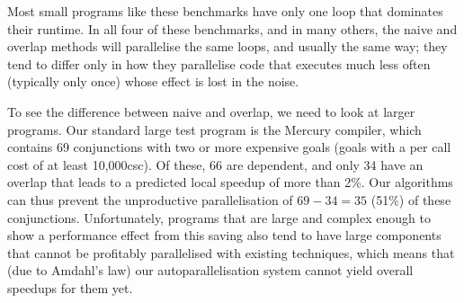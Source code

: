 

Most small programs like these benchmarks
have only one loop that dominates their runtime.
In all four of these benchmarks, and in many others,
the naive and overlap methods will parallelise the same loops,
and usually the same way;
they tend to differ only in how they parallelise code
that executes much less often (typically only once)
whose effect is lost in the noise.


To see the difference between naive and overlap,
we need to look at larger programs.
Our standard large test program is the Mercury compiler, which contains
69 conjunctions with two or more expensive goals
(goals with a per call cost of at least 10,000csc).
Of these, 66 are dependent,
and only 34 have an overlap
that leads to a predicted local speedup of more than 2\%.
Our algorithms can thus prevent
the unproductive parallelisation of $69-34=35$ (51\%) of these conjunctions.
Unfortunately, programs that are large and complex enough
to show a performance effect from this saving
also tend to have large components
that cannot be profitably parallelised with existing techniques,
which means that (due to Amdahl's law)
our autoparallelisation system cannot yield overall speedups for them yet.

